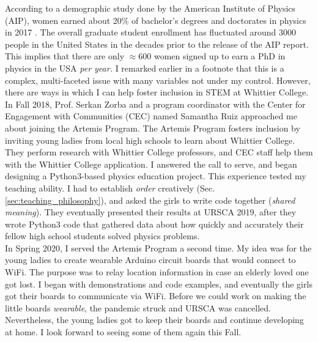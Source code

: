 \documentclass[../../../main.tex]{subfiles}
\begin{document}
According to a demographic study done by the American Institute of Physics (AIP), women earned about 20\% of bachelor's degrees and doctorates in physics in 2017 \cite{aip}.  The overall graduate student enrollment has fluctuated around 3000 people in the United States in the decades prior to the release of the AIP report.  This implies that there are only $\approx 600$ women signed up to earn a PhD in physics in the USA \textit{per year.}  I remarked earlier in a footnote that this is a complex, multi-faceted issue with many variables not under my control.  However, there are ways in which I can help foster inclusion in STEM at Whittier College.
\\
\vspace{0.25cm}
In Fall 2018, Prof. Serkan Zorba and a program coordinator with the Center for Engagement with Communities (CEC) named Samantha Ruiz approached me about joining the Artemis Program.  The Artemis Program fosters inclusion by inviting young ladies from local high schools to learn about Whittier College.  They perform research with Whittier College professors, and CEC staff help them with the Whittier College application.  I answered the call to serve, and began designing a Python3-based physics education project.  This experience tested my teaching ability.  I had to establish \textit{order} creatively (Sec. \ref{sec:teaching_philosophy}), and asked the girls to write code together (\textit{shared meaning}).  They eventually presented their results at URSCA 2019, after they wrote Python3 code that gathered data about how quickly and accurately their fellow high school students solved physics problems.
\\
\vspace{0.25cm}
In Spring 2020, I served the Artemis Program a second time.  My idea was for the young ladies to create wearable Arduino circuit boards that would connect to WiFi.  The purpose was to relay location information in case an elderly loved one got lost.  I began with demonstrations and code examples, and eventually the girls got their boards to communicate via WiFi.  Before we could work on making the little boards \textit{wearable}, the pandemic struck and URSCA was cancelled.  Nevertheless, the young ladies got to keep their boards and continue developing at home.  I look forward to seeing some of them again this Fall.
\end{document}
